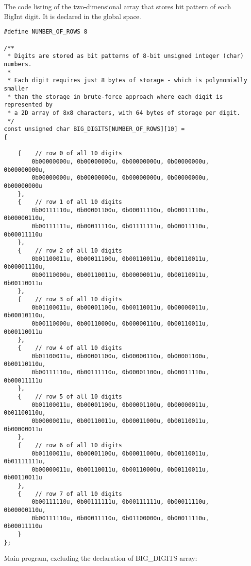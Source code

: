 \documentclass{article}
\begin{document}
\paragraph{}\

	
	\noindent The code listing of the two-dimensional array that stores bit pattern of each BigInt digit. It is declared in the global space.
	
	\begin{verbatim}
#define NUMBER_OF_ROWS 8

/**
 * Digits are stored as bit patterns of 8-bit unsigned integer (char) numbers.
 *
 * Each digit requires just 8 bytes of storage - which is polynomially smaller
 * than the storage in brute-force approach where each digit is represented by
 * a 2D array of 8x8 characters, with 64 bytes of storage per digit.
 */
const unsigned char BIG_DIGITS[NUMBER_OF_ROWS][10] = 
{

    {    // row 0 of all 10 digits
        0b00000000u, 0b00000000u, 0b00000000u, 0b00000000u, 0b00000000u,
        0b00000000u, 0b00000000u, 0b00000000u, 0b00000000u, 0b00000000u
    },
    {    // row 1 of all 10 digits
        0b00111110u, 0b00001100u, 0b00011110u, 0b00011110u, 0b00000110u,
        0b00111111u, 0b00011110u, 0b01111111u, 0b00011110u, 0b00011110u
    },
    {    // row 2 of all 10 digits
        0b01100011u, 0b00011100u, 0b00110011u, 0b00110011u, 0b00001110u,
        0b00110000u, 0b00110011u, 0b00000011u, 0b00110011u, 0b00110011u
    },
    {    // row 3 of all 10 digits
        0b01100011u, 0b00001100u, 0b00110011u, 0b00000011u, 0b00010110u,
        0b00110000u, 0b00110000u, 0b00000110u, 0b00110011u, 0b00110011u
    },
    {    // row 4 of all 10 digits
        0b01100011u, 0b00001100u, 0b00000110u, 0b00001100u, 0b00110110u,
        0b00111110u, 0b00111110u, 0b00001100u, 0b00011110u, 0b00011111u
    },
    {    // row 5 of all 10 digits
        0b01100011u, 0b00001100u, 0b00001100u, 0b00000011u, 0b01100110u,
        0b00000011u, 0b00110011u, 0b00011000u, 0b00110011u, 0b00000011u
    },
    {    // row 6 of all 10 digits
        0b01100011u, 0b00001100u, 0b00011000u, 0b00110011u, 0b01111111u,
        0b00000011u, 0b00110011u, 0b00110000u, 0b00110011u, 0b00110011u
    },
    {    // row 7 of all 10 digits
        0b00111110u, 0b00111111u, 0b00111111u, 0b00011110u, 0b00000110u,
        0b00111110u, 0b00011110u, 0b01100000u, 0b00011110u, 0b00011110u
    }
};	
	\end{verbatim}
	
	\noindent Main program, excluding the declaration of BIG_DIGITS array:
	
\end{document}
